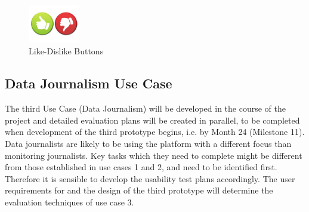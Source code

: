 \begin{figure}[ht]
    \centering
    \includegraphics[width=0.2\textwidth]{./images/like_dislike.jpg}
    \caption{Like-Dislike Buttons}
    \label{fig:like-dislike}
\end{figure}


\subsection{Data Journalism Use Case}
The third Use Case (Data Journalism) will be developed in the course of the project and detailed evaluation plans will be created in parallel, to be completed when development of the third prototype begins, i.e. by Month 24 (Milestone 11). Data journalists are likely to be using the \SUMMA platform with a different focus than monitoring journalists. Key tasks which they need to complete might be different from those established in use cases 1 and 2, and need to be identified first. Therefore it is sensible to develop the usability test plans accordingly. The user requirements for and the design of the third prototype will determine the evaluation techniques of use case 3.

